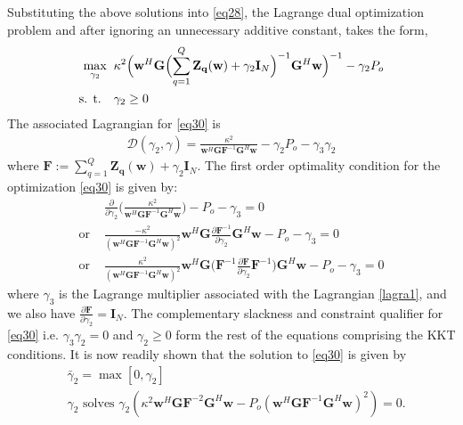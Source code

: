 \documentclass[11pt,draftclsnofoot,onecolumn]{IEEEtran}
\theoremstyle{definition}
\theoremstyle{remark}
\begin{document}
Substituting the above solutions into \eqref{eq28}, the Lagrange dual optimization problem and after ignoring an unnecessary additive constant, takes the form,
\begin{align} \label{eq30}
\max\limits_{\gamma_2} \;\; &\kappa^2 \Bigl( \mathbf{w}^H\mathbf{G} \Bigl( \sum\limits_{q=1}^Q \mathbf{Z_q}( \mathbf{w})+\gamma_2\mathbf{I}_N\Bigr)^{-1}\mathbf{G}^H\mathbf{w}\Bigr)^{-1}-\gamma_2P_o \nonumber \\
\mbox{s. t. } \;\;&\gamma_2\geq0
\end{align}
The associated Lagrangian for \eqref{eq30} is
\begin{align}\label{lagra1}
\mathcal{D}(\gamma_2,\gamma)=\frac{\kappa^2} {\mathbf{w}^H\mathbf{G}\mathbf{F}^{-1} \mathbf{G}^H\mathbf{w}} -\gamma_2P_o-\gamma_3\gamma_2
\end{align}
where $\mathbf{F}:=\sum\limits_{q=1}^Q \mathbf{Z_q}( \mathbf{w})+\gamma_2\mathbf{I}_N$. The first order optimality condition for the optimization \eqref{eq30} is given by:
\begin{align*} 
&\frac{\partial}{\partial \gamma_2} \bigl( \frac{\kappa^2} {\mathbf{w}^H\mathbf{G}\mathbf{F}^{-1} \mathbf{G}^H\mathbf{w}} \bigr)-P_o-\gamma_3 =0 \nonumber \\
\mbox{or } &\frac{-\kappa^2}{ ( \mathbf{w}^H\mathbf{G}\mathbf{F}^{-1} \mathbf{G}^H\mathbf{w})^{2}} \mathbf{w}^H\mathbf{G}\frac{\partial\mathbf{F}^{-1}}{\partial\gamma_2}\mathbf{G}^H\mathbf{w}-P_o -\gamma_3 =0 \nonumber \\
\mbox{or } &\frac{\kappa^2}{ ( \mathbf{w}^H\mathbf{G}\mathbf{F}^{-1} \mathbf{G}^H\mathbf{w})^{2}} \mathbf{w}^H\mathbf{G}\bigl( \mathbf{F}^{-1}\frac{\partial\mathbf{F}}{\partial\gamma_2} \mathbf{F}^{-1} \bigr)\mathbf{G}^H\mathbf{w}-P_o -\gamma_3 =0 \nonumber 
\end{align*}
where $\gamma_3$ is the Lagrange multiplier associated with the Lagrangian \eqref{lagra1}, and we also have $\tfrac{\partial \mathbf{F}}{\partial \gamma_2}=\mathbf{I}_N$. The complementary slackness and constraint qualifier for \eqref{eq30} i.e. $\gamma_3\gamma_2=0$ and $\gamma_2\geq0$ form the rest of the equations comprising the KKT conditions. It is now readily shown that the solution to \eqref{eq30} is given by
\begin{align} \label{eq31}
&\bar{\gamma}_2=\max [0,\gamma_2] \\
&\gamma_2 \mbox{ solves } \gamma_2\left( \kappa^2\mathbf{w}^H\mathbf{G}\mathbf{F}^{-2}\mathbf{G}^H\mathbf{w}-P_o( \mathbf{w}^H\mathbf{G}\mathbf{F}^{-1}\mathbf{G}^H\mathbf{w})^2\right)=0 \nonumber.
\end{align}
\end{document}
